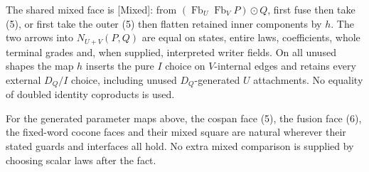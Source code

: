 \documentclass[11pt]{article}
\newcommand{\Fb}{\operatorname{Fb}}\newcommand{\Alg}{\operatorname{Alg}}\newcommand{\Par}{\operatorname{Par}}
\begin{document}
The shared mixed face is [Mixed]: from $(\Fb_U\Fb_VP)\odot Q$, first fuse then take (5), or first take the outer (5) then flatten retained inner components by $h$. The two arrows into $N_{U+V}(P,Q)$ are equal on states, entire laws, coefficients, whole terminal grades and, when supplied, interpreted writer fields. On all unused shapes the map $h$ inserts the pure $I$ choice on $V$-internal edges and retains every external $D_Q/I$ choice, including unused $D_Q$-generated $U$ attachments. No equality of doubled identity coproducts is used.

\begin{proposition}
For the generated parameter maps above, the cospan face (5), the fusion face (6), the fixed-word cocone faces and their mixed square are natural wherever their stated guards and interfaces all hold. No extra mixed comparison is supplied by choosing scalar laws after the fact.
\end{proposition}
\end{document}
